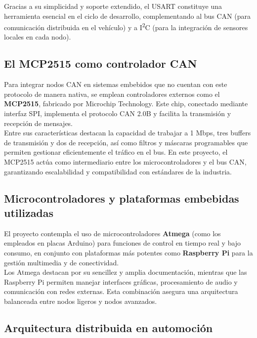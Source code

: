 Gracias a su simplicidad y soporte extendido, el USART constituye una herramienta esencial en el ciclo de desarrollo, complementando al bus CAN (para comunicación distribuida en el vehículo) y a I\textsuperscript{2}C (para la integración de sensores locales en cada nodo).


\subsection{El MCP2515 como controlador CAN}

Para integrar nodos CAN en sistemas embebidos que no cuentan con este protocolo de manera nativa, se emplean controladores externos como el \textbf{MCP2515}, fabricado por Microchip Technology. Este chip, conectado mediante interfaz SPI, implementa el protocolo CAN 2.0B y facilita la transmisión y recepción de mensajes.\\

Entre sus características destacan la capacidad de trabajar a 1 Mbps, tres buffers de transmisión y dos de recepción, así como filtros y máscaras programables que permiten gestionar eficientemente el tráfico en el bus. En este proyecto, el MCP2515 actúa como intermediario entre los microcontroladores y el bus CAN, garantizando escalabilidad y compatibilidad con estándares de la industria.

\subsection{Microcontroladores y plataformas embebidas utilizadas}

El proyecto contempla el uso de microcontroladores \textbf{Atmega} (como los empleados en placas Arduino) para funciones de control en tiempo real y bajo consumo, en conjunto con plataformas más potentes como \textbf{Raspberry Pi} para la gestión multimedia y de conectividad.\\

Los Atmega destacan por su sencillez y amplia documentación, mientras que las Raspberry Pi permiten manejar interfaces gráficas, procesamiento de audio y comunicación con redes externas. Esta combinación asegura una arquitectura balanceada entre nodos ligeros y nodos avanzados.

\subsection{Arquitectura distribuida en automoción}

